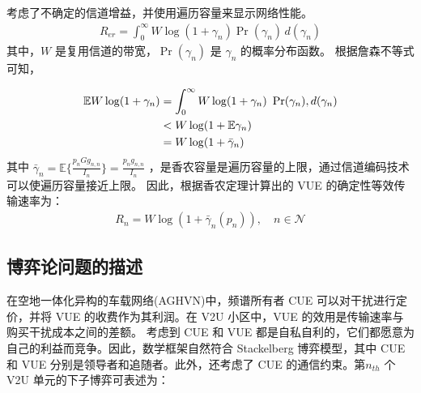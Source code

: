 考虑了不确定的信道增益，并使用遍历容量来显示网络性能。
\begin{eqnarray}\label{E2-8}
R_{er}=\int_{0}^{\infty} W \log(1+\gamma_{n})\Pr(\gamma_{n})\, d(\gamma_{n})
\end{eqnarray}
其中，$W$ 是复用信道的带宽，$\Pr(\gamma_{n})$ 是 $\gamma_{n}$ 的概率分布函数。
根据詹森不等式可知，

\begin{align} \label{E2-9}
\mathbb{E}{W \log(1+\gamma_{n})} &= \int_{0}^{\infty} W \log(1+\gamma_{n})\ \Pr(\gamma_{n}), d(\gamma_{n}) \\
&< W\log(1+\mathbb{E}{\gamma_{n}})   \notag \\
&= W\log(1+\bar{\gamma}_{n})                \notag
\end{align}
其中 $\bar{\gamma}_{n}\!=\mathbb{E}\{\!\frac{p_{n}G g_{n,n}}{I_n}\}
\!=\!\frac{p_{n}g_{n,n}}{I_n}$ ，是香农容量是遍历容量的上限，通过信道编码技术可以使遍历容量接近上限。
因此，根据香农定理计算出的 VUE 的确定性等效传输速率为：
\begin{eqnarray}\label{E2-10}
R_{n}=W\log(1+\bar{\gamma}_{n}(p_n)),\quad  n\in\mathcal{N}
\end{eqnarray}
\subsection{博弈论问题的描述}\label{section2-2-2}
在空地一体化异构的车载网络(AGHVN)中，频谱所有者 CUE 可以对干扰进行定价，并将 VUE 的收费作为其利润。在 V2U 小区中，VUE 的效用是传输速率与购买干扰成本之间的差额。
考虑到 CUE 和 VUE 都是自私自利的，它们都愿意为自己的利益而竞争。因此，数学框架自然符合 Stackelberg 博弈模型，其中 CUE 和 VUE 分别是领导者和追随者。此外，还考虑了
 CUE 的通信约束。第$n_{th}$ 个V2U 单元的下子博弈可表述为：

